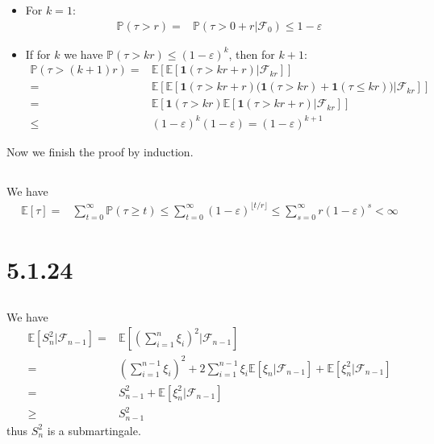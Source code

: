 \documentclass[11pt,a4paper]{ctexart}
\numberwithin{equation}{section}%
\newcommand{\F}{\mathcal{F}}
\begin{document}
\begin{itemize}[topsep=2pt,itemsep=0pt]
    \item For $ k=1 $:
    \begin{align*}
        \mathbb{P}\left( \tau >r \right) =& \mathbb{P}\left( \tau >0+r|\F_0 \right) \leq 1-\varepsilon   
    \end{align*}
    \item If for $ k $ we have $ \mathbb{P}\left( \tau >kr \right) \leq (1-\varepsilon )^{k} $, then for $ k+1 $:
    \begin{align*}
        \mathbb{P}\left( \tau >(k+1)r \right) =& \mathbb{E}\left[ \mathbb{E}\left[ \mathbf{1}(\tau>kr+r) | \F_{kr} \right]  \right]\\
        =& \mathbb{E}\left[ \mathbb{E}\left[ \mathbf{1}(\tau>kr+r)\big( \mathbf{1}(\tau>kr) + \mathbf{1}(\tau\leq kr) \big) | \F_{kr} \right]  \right] \\
        =& \mathbb{E}\left[ \mathbf{1}(\tau>kr)\mathbb{E}\left[ \mathbf{1}(\tau>kr+r) | \F_{kr} \right]  \right] \\
        \leq & (1-\varepsilon )^k(1-\varepsilon ) = (1-\varepsilon )^{k+1}
    \end{align*}
\end{itemize}
Now we finish the proof by induction.

\subsection{}

We have
\begin{align*}
    \mathbb{E}\left[ \tau \right] =& \sum_{t=0}^\infty \mathbb{P}\left( \tau \geq t \right)   
    \leq \sum_{t=0}^\infty (1-\varepsilon )^{\lfloor t/r \rfloor} 
    \leq \sum_{s=0}^\infty r(1-\varepsilon )^s <\infty 
\end{align*}


\section{5.1.24}

\subsection{}

We have
\begin{align*}
    \mathbb{E}\left[ S_n^2 | \F_{n-1} \right] =& \mathbb{E}\left[ (\sum_{i=1}^n \xi _i)^2 | \F_{n-1} \right]  \\
    =& (\sum_{i=1}^{n-1} \xi _i)^2 + 2\sum_{i=1}^{n-1} \xi _i \mathbb{E}\left[ \xi _n | \F_{n-1} \right] + \mathbb{E}\left[ \xi _n^2 | \F_{n-1} \right] \\
    =& S_{n-1}^2 + \mathbb{E}\left[ \xi _n^2 | \F_{n-1} \right]\\
    \geq & S_{n-1}^2
\end{align*}
thus $ S_n^2 $ is a submartingale.
\end{document}
